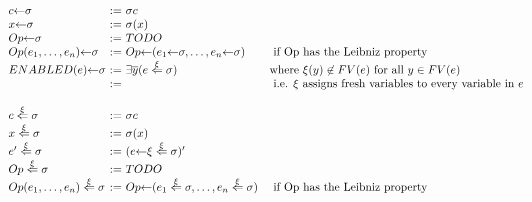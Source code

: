 \documentclass[a4paper]{article}
\newcommand{\inst}[2]{#1 {\leftarrow} #2}
\newcommand{\einst}[3]{#1 \stackrel{#2}{\Leftarrow} #3}
\begin{document}
\[
\begin{array}[h]{l@{\,\,:=\,\,}lp{7cm}}
  \inst{c}{\sigma} & \sigma{c} & \\
  \inst{x}{\sigma} & \sigma(x) & \\
  \inst{Op}{\sigma} & TODO & \\
  \inst{Op(e_1, \ldots, e_n)}{\sigma}
                   & \inst{Op}{}(\inst{e_1}{\sigma}, \ldots, \inst{e_n}{\sigma})
                       & \mbox{ if Op has the Leibniz property} \\
  \inst{ENABLED(e)}{\sigma} & \exists \overline{y}( \einst{e}{\xi}{\sigma} )
                       & \mbox{where $\xi(y) \not \in FV(e)$ for all $y \in FV(e)$} \\
 & & \mbox{
                            i.e. $\xi$ assigns fresh variables to every variable
                            in $e$ }  \\

  \einst{c}{\xi}{\sigma} & \sigma{c} & \\
  \einst{x}{\xi}{\sigma} & \sigma(x) & \\
  \einst{e'}{\xi}{\sigma} & (\einst{\inst{e}{\xi}}{\xi}{\sigma})' & \\
  \einst{Op}{\xi}{\sigma} & TODO & \\
  \einst{Op(e_1, \ldots, e_n)}{\xi}{\sigma}
                   & \inst{Op}{}(\einst{e_1}{\xi}{\sigma}, \ldots, \einst{e_n}{\xi}{\sigma})
                       & \mbox{ if Op has the Leibniz property} \\
\end{array}
\]
\end{document}
